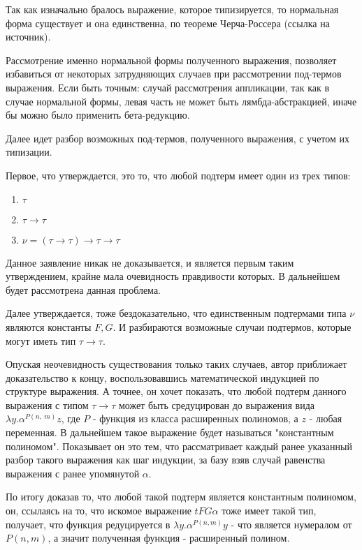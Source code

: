 \documentclass[times,specification,annotation]{itmo-student-thesis}
\begin{document}
    Так как изначально бралось выражение, которое типизируется, то нормальная форма существует и она единственна, по теореме Черча-Россера (ссылка на источник).

    Рассмотрение именно нормальной формы полученного выражения, позволяет избавиться от некоторых затрудняющих случаев при рассмотрении под-термов выражения. Если быть точным: случай рассмотрения аппликации, так как в случае нормальной формы, левая часть не может быть лямбда-абстракцией, иначе бы можно было применить бета-редукцию.
    
    Далее идет разбор возможных под-термов, полученного выражения, с учетом их типизации.

    Первое, что утверждается, это то, что любой подтерм имеет один из трех типов:

    \begin{enumerate}
        \item \(\tau\)
        \item \(\tau \rightarrow \tau\)
        \item \(\nu = (\tau \rightarrow \tau) \rightarrow \tau \rightarrow \tau\)
    \end{enumerate}

    Данное заявление никак не доказывается, и является первым таким утверждением, крайне мала очевидность правдивости которых. В дальнейшем будет рассмотрена данная проблема. 

    Далее утверждается, тоже бездоказательно, что единственным подтермами типа \(\nu\) являются константы \(F, G\). И разбираются возможные случаи подтермов, которые могут иметь тип \(\tau \rightarrow \tau\).

    Опуская неочевидность существования только таких случаев, автор приближает доказательство к концу, воспользовавшись математической индукцией по структуре выражения. А точнее, он хочет показать, что любой подтерм данного выражения с типом \(\tau \rightarrow \tau\) может быть средуцирован до выражения вида \(\lambda y . \alpha^{P(n,\ m)} z\), где  \(P\) - функция из класса расширенных полиномов, а \(z\) - любая переменная. В дальнейшем такое выражение будет называться "константным полиномом". Показывает он это тем, что рассматривает каждый ранее указанный разбор такого выражения как шаг индукции, за базу взяв случай равенства выражения с ранее упомянутой \(\alpha\). 

    По итогу доказав то, что любой такой подтерм является константным полиномом, он, ссылаясь на то, что искомое выражение \(t F G \alpha\) тоже имеет такой тип, получает, что функция редуцируется в \(\lambda y. \alpha^{P(n, m)}y \) - что является нумералом от \(P(n, m)\), а значит полученная функция - расширенный полином.   
\end{document}
